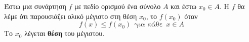 Έστω μια συνάρτηση $ f $ με πεδίο ορισμού ένα σύνολο $ A $ και έστω $ x_0\in A $. Η $ f $ θα λέμε ότι παρουσιάζει ολικό μέγιστο στη θέση $ x_0 $, το $ f(x_0) $ όταν 
\[ f(x)\leq f(x_0)\ \ \textrm{για κάθε}\ \ x\in A \]
Το $ x_0 $ λέγεται \textbf{θέση} του μέγιστου.
